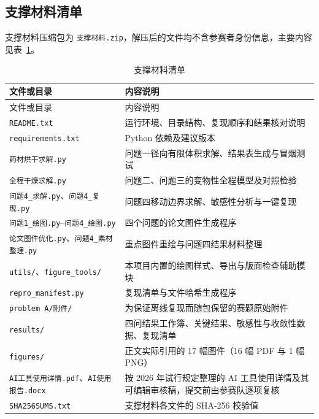 \documentclass[withoutpreface,bwprint]{cumcmthesis}
\begin{document}
\ifdefined\CUMCMBodyOnly
\else
\clearpage
\begin{appendices}

\section{支撑材料清单}

支撑材料压缩包为 \texttt{支撑材料.zip}，解压后的文件均不含参赛者身份信息，主要内容见表~\ref{tab:support-materials}。

\begin{longtable}{>{\raggedright\arraybackslash}p{}
                  >{\raggedright\arraybackslash}p{}}
\caption{支撑材料清单}\label{tab:support-materials}\\
\toprule
文件或目录 & 内容说明\\
\midrule
\endfirsthead
\toprule
文件或目录 & 内容说明\\
\midrule
\endhead
\texttt{README.txt} & 运行环境、目录结构、复现顺序和结果核对说明\\
\texttt{requirements.txt} & Python 依赖及建议版本\\
\texttt{药材烘干求解.py} & 问题一径向有限体积求解、结果表生成与冒烟测试\\
\texttt{全程干燥求解.py} & 问题二、问题三的变物性全程模型及对照检验\\
\texttt{问题4\_求解.py}、\texttt{问题4\_复现.py} & 问题四移动边界求解、敏感性分析与一键复现\\
\texttt{问题1\_绘图.py}--\texttt{问题4\_绘图.py} & 四个问题的论文图件生成程序\\
\texttt{论文图件优化.py}、\texttt{问题4\_素材整理.py} & 重点图件重绘与问题四结果材料整理\\
\texttt{utils/}、\texttt{figure\_tools/} & 本项目内置的绘图样式、导出与版面检查辅助模块\\
\texttt{repro\_manifest.py} & 复现清单与文件哈希生成程序\\
\texttt{problem A/附件/} & 为保证离线复现而随包保留的赛题原始附件\\
\texttt{results/} & 四问结果工作簿、关键结果、敏感性与收敛性数据、复现清单\\
\texttt{figures/} & 正文实际引用的 17 幅图件（16 幅 PDF 与 1 幅 PNG）\\
\texttt{AI工具使用详情.pdf}、\texttt{AI使用报告.docx} & 按 2026 年试行规定整理的 AI 工具使用详情及其可编辑审核稿，提交前由参赛队逐项复核\\
\texttt{SHA256SUMS.txt} & 支撑材料各文件的 SHA-256 校验值\\
\bottomrule
\end{longtable}


\end{appendices}
\end{document}
